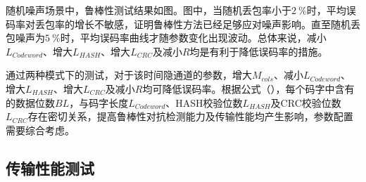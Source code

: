 随机噪声场景中，鲁棒性测试结果如图。图中，当随机丢包率小于{$2\ \%$}时，平均误码率对丢包率的增长不敏感，证明鲁棒性方法已经足够应对噪声影响。直至随机丢包噪声为{$5\ \%$}时，平均误码率曲线才随参数变化出现波动。总体来说，减小$L_{Codeword}$、增大$L_{HASH}$、增大$L_{CRC}$及减小$R$均是有利于降低误码率的措施。

通过两种模式下的测试，对于该时间隐通道的参数，增大$M_{cols}$、减小$L_{Codeword}$、增大$L_{HASH}$、增大$L_{CRC}$及减小$R$均可降低误码率。根据公式（），每个码字中含有的数据位数$BL$，与码字长度$L_{Codeword}$、HASH校验位数$L_{HASH}$及CRC校验位数$L_{CRC}$存在密切关系，提高鲁棒性对抗检测能力及传输性能均产生影响，参数配置需要综合考虑。

\subsection{传输性能测试}
\label{chap:hash:result:throughput}

